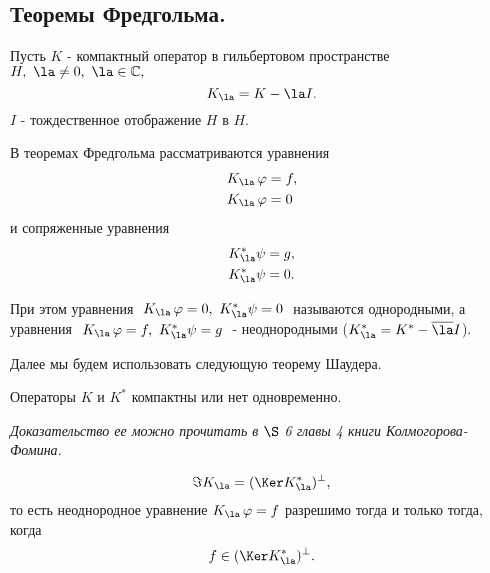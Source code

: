 \documentclass[a4paper]{article}
\newcommand{\ff} {\varphi}
\begin{document}
\subsection{Теоремы Фредгольма.}

Пусть $K$ - компактный оператор в гильбертовом пространстве $H, \
\la \not = 0,\ \la \in \mathbb{C},$
$$
K_\la = K - \la I.
$$
$I$ - тождественное  отображение $H$ в $H.$

В теоремах Фредгольма рассматриваются уравнения
$$
\begin{aligned}
K_\la \, \ff &= f,\\
K_\la \, \ff &= 0
\end{aligned}
$$
и сопряженные уравнения
$$
\begin{aligned}
K_\la^{*} \psi &= g,\\
K_\la^{*} \psi &= 0.
\end{aligned}
$$

При этом уравнения $\ K_\la \, \ff = 0,\ K_\la^{*} \psi = 0\ $
называются однородными, а уравнения $\ K_\la \, \ff = f, \
K_\la^{*} \psi = g\ $ - неоднородными ($K_\la^{*} = K^{*} -
\overline{\la} I$).

Далее мы будем использовать следующую теорему Шаудера.

\begin{theorem}
Операторы $K$ и $K^{*}$ компактны или нет одновременно.
\end{theorem}

\emph{Доказательство ее можно прочитать в $\S$ 6 главы 4 книги
Колмогорова-Фомина.}

\begin{theorem}[1]
$$
\Im K_\la = (\Ker K^{*}_\la )^{\bot},
$$
то есть неоднородное уравнение $K_\la \, \ff = f$ разрешимо тогда
и только тогда, когда $$f \in (\Ker K^{*}_\la )^{\bot}.$$
\end{theorem}
\end{document}
